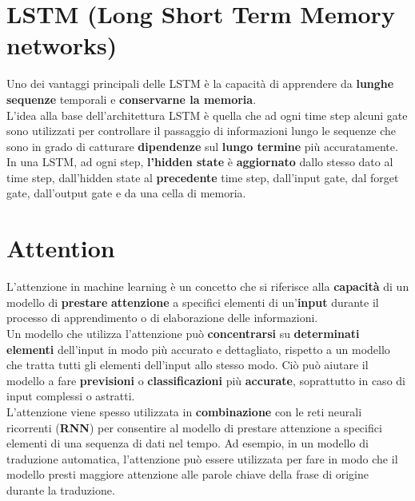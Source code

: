 \documentclass{article}
\begin{document}
\section{LSTM (Long Short Term Memory networks)}
Uno dei vantaggi principali delle LSTM è la capacità di apprendere da \textbf{lunghe sequenze} temporali e \textbf{conservarne la memoria}.\\
L’idea alla base dell’architettura LSTM è quella che ad ogni time step alcuni gate sono utilizzati per controllare il passaggio di informazioni lungo le sequenze che sono in grado di catturare \textbf{dipendenze} sul \textbf{lungo termine} più accuratamente. In una LSTM, ad ogni step,\textbf{ l’hidden state} è \textbf{aggiornato} dallo stesso dato al time step, dall’hidden state al \textbf{precedente} time step, dall’input gate, dal forget gate, dall’output gate e da una cella di memoria.

\section{Attention}
L'attenzione in machine learning è un concetto che si riferisce alla \textbf{capacità} di un modello di \textbf{prestare} \textbf{attenzione} a specifici elementi di un'\textbf{input} durante il processo di apprendimento o di elaborazione delle informazioni.\\

Un modello che utilizza l'attenzione può \textbf{concentrarsi} su \textbf{determinati} \textbf{elementi} dell'input in modo più accurato e dettagliato, rispetto a un modello che tratta tutti gli elementi dell'input allo stesso modo. Ciò può aiutare il modello a fare \textbf{previsioni} o \textbf{classificazioni} più \textbf{accurate}, soprattutto in caso di input complessi o astratti.\\

L'attenzione viene spesso utilizzata in \textbf{combinazione} con le reti neurali ricorrenti (\textbf{RNN}) per consentire al modello di prestare attenzione a specifici elementi di una sequenza di dati nel tempo. Ad esempio, in un modello di traduzione automatica, l'attenzione può essere utilizzata per fare in modo che il modello presti maggiore attenzione alle parole chiave della frase di origine durante la traduzione.
\end{document}
